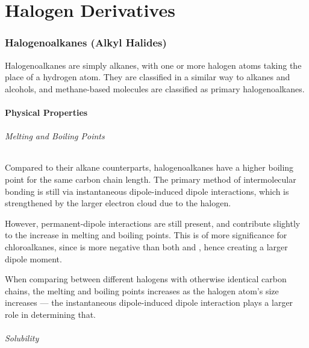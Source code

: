 

\pagebreak
\hypertarget{ChapterHalogenDerivatives}{}
\part{Halogen Derivatives}

	\section{Halogenoalkanes (Alkyl Halides)}

		Halogenoalkanes are simply alkanes, with one or more halogen atoms taking the place of a hydrogen atom. They are classified in a
		similar way to alkanes and alcohols, and methane-based molecules are classified as primary halogenoalkanes.


		\subsection{Physical Properties}

			\paragraph{Melting and Boiling Points}

			Compared to their alkane counterparts, halogenoalkanes have a higher boiling point for the same carbon chain length.
			The primary method of intermolecular bonding is still via instantaneous dipole-induced dipole interactions, which is strengthened
			by the larger electron cloud due to the halogen.

			However, permanent-dipole interactions are still present, and contribute slightly to the increase in melting and boiling points.
			This is of more significance for chloroalkanes, since \ch{\Cl} is more negative than both  and , hence creating
			a larger dipole moment.

			When comparing between different halogens with otherwise identical carbon chains, the melting and boiling points increases as
			the halogen atom's size increases --- the instantaneous dipole-induced dipole interaction plays a larger role in determining
			that.

			\paragraph{Solubility}

